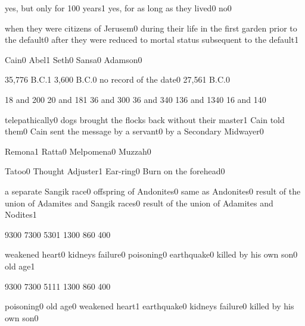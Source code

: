 {yes, but only for 100 years}{1}
{yes, for as long as they lived}{0}
{no}{0}
\qstop

{when they were citizens of Jerusem}{0}
{during their life in the first garden prior to the default}{0}
{after they were reduced to mortal status subsequent to the default}{1}
\qstop

{Cain}{0}
{Abel}{1}
{Seth}{0}
{Sansa}{0}
{Adamson}{0}
\qstop

{35,776 B.C.}{1}
{3,600 B.C.}{0}
{no record of the date}{0}
{27,561 B.C.}{0}
\qstop

{18 and 20}{0}
{20 and 18}{1}
{36 and 30}{0}
{36 and 34}{0}
{136 and 134}{0}
{16 and 14}{0}
\qstop

{telepathically}{0}
{dogs brought the flocks back without their master}{1}
{Cain told them}{0}
{Cain sent the message by a servant}{0}
{by a Secondary Midwayer}{0}
\qstop

{Remona}{1}
{Ratta}{0}
{Melpomena}{0}
{Muzzah}{0}
\qstop

{Tatoo}{0}
{Thought Adjuster}{1}
{Ear-ring}{0}
{Burn on the forehead}{0}
\qstop

{a separate Sangik race}{0}
{offspring of Andonites}{0}
{same as Andonites}{0}
{result of the union of Adamites and Sangik races}{0}
{result of the union of Adamites and Nodites}{1}
\qstop

{930}{0}
{730}{0}
{530}{1}
{130}{0}
{86}{0}
{40}{0}
\qstop

{weakened heart}{0}
{kidneys failure}{0}
{poisoning}{0}
{earthquake}{0}
{killed by his own son}{0}
{old age}{1}
\qstop

{930}{0}
{730}{0}
{511}{1}
{130}{0}
{86}{0}
{40}{0}
\qstop

{poisoning}{0}
{old age}{0}
{weakened heart}{1}
{earthquake}{0}
{kidneys failure}{0}
{killed by his own son}{0}
\qstop

